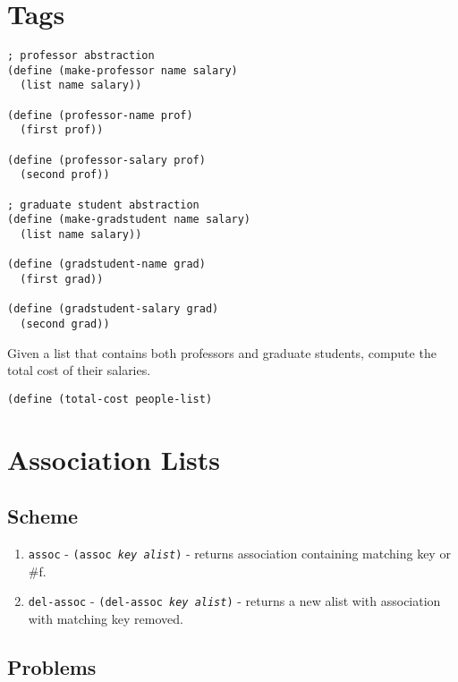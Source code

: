 


\section*{Tags}

\begin{verbatim}
; professor abstraction
(define (make-professor name salary)
  (list name salary))

(define (professor-name prof)
  (first prof))

(define (professor-salary prof)
  (second prof))

; graduate student abstraction
(define (make-gradstudent name salary)
  (list name salary))

(define (gradstudent-name grad)
  (first grad))

(define (gradstudent-salary grad)
  (second grad))
\end{verbatim}

Given a list that contains both professors and graduate students,
compute the total cost of their salaries.

\begin{verbatim}
(define (total-cost people-list)
\end{verbatim}
\vspace{3in}

\section*{Association Lists}

\subsection*{Scheme}
\begin{enumerate}
\item {\tt assoc} - {\tt (assoc {\it key} {\it alist})} - returns
association containing matching key or \#f.
\vspace{.5in}
\item {\tt del-assoc} - {\tt (del-assoc {\it key} {\it alist})} -
returns a new alist with association with matching key removed.
\vspace{.5in}
\end{enumerate}

\subsection*{Problems}

